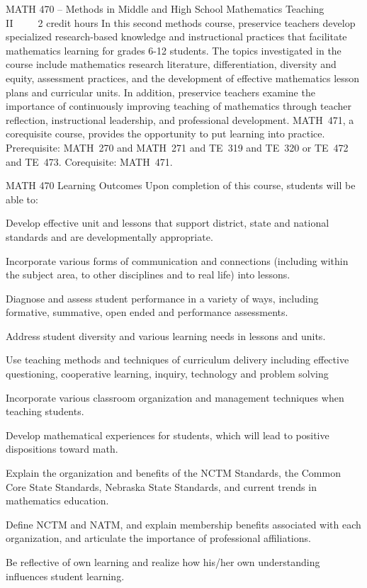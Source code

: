 MATH 470 – Methods in Middle and High School Mathematics Teaching II     2 credit hours
In this second methods course, preservice teachers develop specialized research-based knowledge and instructional practices that facilitate mathematics learning for grades 6-12 students. The topics investigated in the course include mathematics research literature, differentiation, diversity and equity, assessment practices, and the development of effective mathematics lesson plans and curricular units. In addition, preservice teachers examine the importance of continuously improving teaching of mathematics through teacher reflection, instructional leadership, and professional development. MATH 471, a corequisite course, provides the opportunity to put learning into practice.
Prerequisite: MATH 270 and MATH 271 and TE 319 and TE 320 or TE 472 and TE 473. 
Corequisite: MATH 471.

MATH 470 Learning Outcomes
Upon completion of this course, students will be able to:
\item Develop effective unit and lessons that support district, state and national standards and are developmentally appropriate.
\item Incorporate various forms of communication and connections (including within the subject area, to other disciplines and to real life) into lessons.
\item Diagnose and assess student performance in a variety of ways, including formative, summative, open ended and performance assessments.
\item Address student diversity and various learning needs in lessons and units.
\item Use teaching methods and techniques of curriculum delivery including effective questioning, cooperative learning, inquiry, technology and problem solving
\item Incorporate various classroom organization and management techniques when teaching students.
\item Develop mathematical experiences for students, which will lead to positive dispositions toward math.
 \item Explain the organization and benefits of the NCTM Standards, the Common Core State Standards, Nebraska State Standards, and current trends in mathematics education.
\item Define NCTM and NATM, and explain membership benefits associated with each organization, and articulate the importance of professional affiliations.
\item Be reflective of own learning and realize how his/her own understanding influences student learning.

